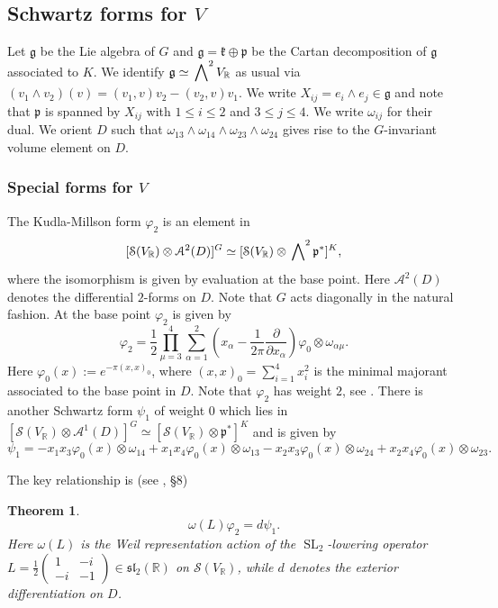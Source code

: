 \documentclass[12pt,leqno]{amsart}
\numberwithin{equation}{section}
\theoremstyle{plain}
\newtheorem{theorem}{Theorem}[section]
\theoremstyle{definition}
\theoremstyle{remark}
\newcommand{\R}{\mathbb{R}}
\newcommand{\wwedge}[1]{\sideset{}{^{#1}}\bigwedge}
\newcommand{\calA}{\mathcal{A}}
\newcommand{\calS}{\mathcal{S}}
\newcommand{\SL}{\operatorname{SL}}
\begin{document}
\subsection{Schwartz forms for $V$}\label{V-forms}

Let $\mathfrak{g} $ be the Lie algebra of $G$ and $\mathfrak{g}= \mathfrak{k} \oplus \mathfrak{p}$ be the Cartan decomposition of $\mathfrak{g}$ associated to $K$.  We identify 
 $\mathfrak{g} \simeq \wwedge{2} V_{\R}$ as usual via $
(v_1 \wedge v_2)(v) = (v_1,v)v_2 - (v_2,v)v_1$. We write $X_{ij} = e_i \wedge e_j \in \mathfrak{g}$ and note that $\mathfrak{p}$ is spanned by $X_{ij}$ with $1 \leq i \leq 2$ and $3 \leq j \leq 4$. We write $\omega_{ij}$ for their dual. We orient $D$ such that $\omega_{13} \wedge \omega_{14} \wedge \omega_{23} \wedge \omega_{24}$ gives rise to the $G$-invariant volume element on $D$. 

\subsubsection{Special forms for $V$}

The Kudla-Millson form $\varphi_2$ is an element in 
\[
 [\calS(V_{\R}) \otimes \calA^2(D)]^G\simeq
[\calS(V_{\R}) \otimes \wwedge{2} \mathfrak{p}^{\ast}]^K,
\]
where the isomorphism is given by evaluation at the base point. Here $\calA^2(D)$ denotes the differential $2$-forms on $D$. Note that $G$ acts diagonally in the natural fashion. At the base point $\varphi_2$ is given by
\[
\varphi_2= \frac12 \prod_{\mu=3}^4 \sum_{\alpha=1}^{2}  \left( x_{\alpha} - \frac1{2\pi}\frac{\partial}{\partial x_{\alpha}} \right) \varphi_0 \otimes \omega_{\alpha\mu}.
\]
Here $\varphi_0(x) := e^{-\pi(x,x)_{0}}$, where $(x,x)_0= \sum_{i=1}^4 x_i^2$ is the minimal majorant associated to the base point in $D$. Note that $\varphi_2$ has weight $2$, see \cite{KM1}. There is another Schwartz form $\psi_1$ of weight $0$ which lies in $
[\calS(V_{\R}) \otimes \calA^1(D)]^G\simeq
[\calS(V_{\R}) \otimes \mathfrak{p}^{\ast}]^K$ and is given by
\begin{equation}\label{psi20}
\psi_1 =  -x_1x_3\varphi_0(x) \otimes \omega_{14}+x_1x_4  \varphi_0(x) \otimes \omega_{13} - x_2x_3 \varphi_0(x) \otimes \omega_{24}+x_2x_4\varphi_0(x) \otimes \omega_{23}. 
\end{equation}


The key relationship is (see \cite{KM90}, \S 8)

\begin{theorem}\label{localholomorphic1}
\[
\omega(L) \varphi_2 = d \psi_1.
\]
Here $\omega(L)$ is the Weil representation action
of the $\SL_2$-lowering operator $L = \tfrac12 \left(
\begin{smallmatrix}1 & -i \\ -i & -1\end{smallmatrix} \right)  \in \mathfrak{sl}_2(\R)$ on
$\calS(V_{\R})$, while $d$ denotes the exterior differentiation on $D$. 
\end{theorem}
\end{document}
